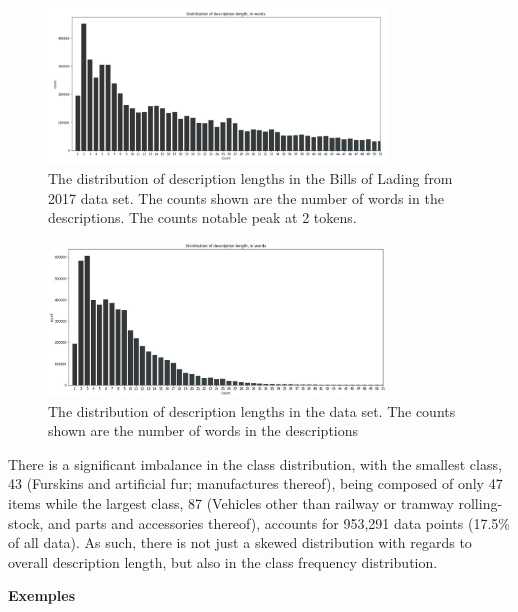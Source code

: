 \begin{figure}[th]
    \centering
    \includegraphics[width=0.8\textwidth]{BOL2.png}
    \caption{The distribution of description lengths in the Bills of Lading from 2017 data set. The counts shown are the number of words in the descriptions. The counts notable peak at 2 tokens.}
    \label{fig:Bol2}
\end{figure}

\begin{figure}[th]
    \centering
    \includegraphics[width=0.8\textwidth]{data.jpg}
    \caption{The distribution of description lengths in the data set. The counts shown are the number of words in the descriptions}
    \label{fig:Data}
\end{figure}

There is a significant imbalance in the class distribution, with the smallest class, 43 (Furskins and artificial fur; manufactures thereof), being composed of only 47 items while the largest class, 87 (Vehicles other than railway or tramway rolling-stock, and parts and accessories thereof), accounts for 953,291 data points (17.5{\%} of all data). As such, there is not just a skewed distribution with regards to overall description length, but also in the class frequency distribution.


\textbf{Exemples}
\\

